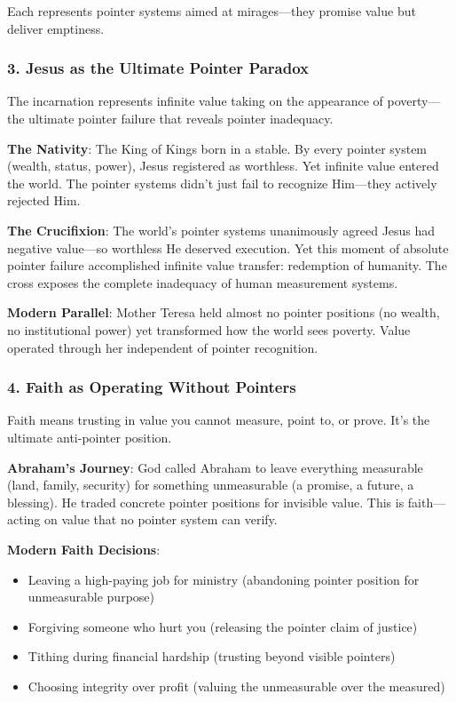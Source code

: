 \documentclass[11pt,oneside]{book}
\begin{document}
Each represents pointer systems aimed at mirages—they promise value but deliver emptiness.

\subsubsection{3. Jesus as the Ultimate Pointer Paradox}

The incarnation represents infinite value taking on the appearance of poverty—the ultimate pointer failure that reveals pointer inadequacy.

\textbf{The Nativity}: The King of Kings born in a stable. By every pointer system (wealth, status, power), Jesus registered as worthless. Yet infinite value entered the world. The pointer systems didn't just fail to recognize Him—they actively rejected Him.

\textbf{The Crucifixion}: The world's pointer systems unanimously agreed Jesus had negative value—so worthless He deserved execution. Yet this moment of absolute pointer failure accomplished infinite value transfer: redemption of humanity. The cross exposes the complete inadequacy of human measurement systems.

\textbf{Modern Parallel}: Mother Teresa held almost no pointer positions (no wealth, no institutional power) yet transformed how the world sees poverty. Value operated through her independent of pointer recognition.

\subsubsection{4. Faith as Operating Without Pointers}

Faith means trusting in value you cannot measure, point to, or prove. It's the ultimate anti-pointer position.

\textbf{Abraham's Journey}: God called Abraham to leave everything measurable (land, family, security) for something unmeasurable (a promise, a future, a blessing). He traded concrete pointer positions for invisible value. This is faith—acting on value that no pointer system can verify.

\textbf{Modern Faith Decisions}:
\begin{itemize}
\item Leaving a high-paying job for ministry (abandoning pointer position for unmeasurable purpose)
\item Forgiving someone who hurt you (releasing the pointer claim of justice)
\item Tithing during financial hardship (trusting beyond visible pointers)
\item Choosing integrity over profit (valuing the unmeasurable over the measured)
\end{itemize}
\end{document}
